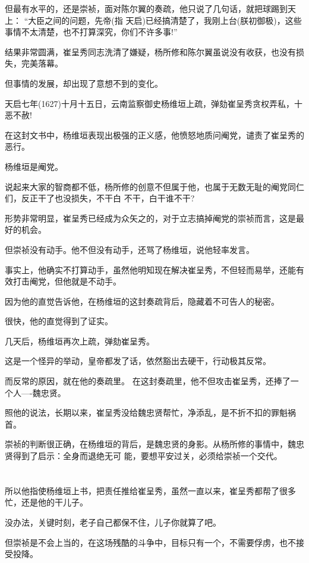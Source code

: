 \documentclass[11pt,a4paper,onecolumn]{article}
\begin{document}
但最有水平的，还是崇祯，面对陈尔翼的奏疏，他只说了几句话，就把球踢到天上： ``大臣之间的问题，先帝(指
天启)已经搞清楚了，我刚上台(朕初御极)，这些事情不太清楚，也不打算深究，你们不许多事!''

结果非常圆满，崔呈秀同志洗清了嫌疑，杨所修和陈尔翼虽说没有收获，也没有损失，完美落幕。

但事情的发展，却出现了意想不到的变化。

天启七年(1627)十月十五日，云南监察御史杨维垣上疏，弹劾崔呈秀贪权弄私，十恶不赦!

在这封文书中，杨维垣表现出极强的正义感，他愤怒地质问阉党，谴责了崔呈秀的恶行。

杨维垣是阉党。

说起来大家的智商都不低，杨所修的创意不但属于他，也属于无数无耻的阉党同仁们，反正干了也没损失，不干白
不干，白干谁不干?

形势非常明显，崔呈秀已经成为众矢之的，对于立志搞掉阉党的崇祯而言，这是最好的机会。

但崇祯没有动手。他不但没有动手，还骂了杨维垣，说他轻率发言。

事实上，他确实不打算动手，虽然他明知现在解决崔呈秀，不但轻而易举，还能有效打击阉党，但他就是不动手。

因为他的直觉告诉他，在杨维垣的这封奏疏背后，隐藏着不可告人的秘密。

很快，他的直觉得到了证实。

几天后，杨维垣再次上疏，弹劾崔呈秀。

这是一个怪异的举动，皇帝都发了话，依然豁出去硬干，行动极其反常。

而反常的原因，就在他的奏疏里。 在这封奏疏里，他不但攻击崔呈秀，还捧了一个人----魏忠贤。

照他的说法，长期以来，崔呈秀没给魏忠贤帮忙，净添乱，是不折不扣的罪魁祸首。

崇祯的判断很正确，在杨维垣的背后，是魏忠贤的身影。从杨所修的事情中，魏忠贤得到了启示：全身而退绝无可
能，要想平安过关，必须给崇祯一个交代。

\section[\thesection]{}

所以他指使杨维垣上书，把责任推给崔呈秀，虽然一直以来，崔呈秀都帮了很多忙，还是他的干儿子。

没办法，关键时刻，老子自己都保不住，儿子你就算了吧。

但崇祯是不会上当的，在这场残酷的斗争中，目标只有一个，不需要俘虏，也不接受投降。
\end{document}
